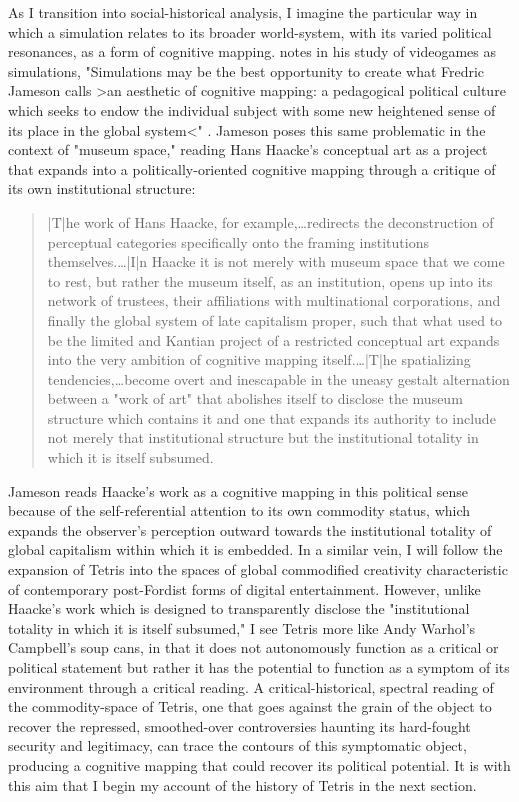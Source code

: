 As I transition into social-historical analysis, I imagine the particular way in which a simulation relates to its broader world-system, with its varied political resonances, as a form of cognitive mapping. \citeauthor{Friedman2005} notes in his study of videogames as simulations, "Simulations may be the best opportunity to create what Fredric Jameson calls >an aesthetic of cognitive mapping: a pedagogical political culture which seeks to endow the individual subject with some new heightened sense of its place in the global system<" \autocite[141]{Friedman2005}. Jameson poses this same problematic in the context of "museum space," reading Hans Haacke's conceptual art as a project that expands into a politically-oriented cognitive mapping through a critique of its own institutional structure:
\blockquote{
  |T|he work of Hans Haacke, for example,…redirects the deconstruction of perceptual categories specifically onto the framing institutions themselves.…|I|n Haacke it is not merely with museum space that we come to rest, but rather the museum itself, as an institution, opens up into its network of trustees, their affiliations with multinational corporations, and finally the global system of late capitalism proper, such that what used to be the limited and Kantian project of a restricted conceptual art expands into the very ambition of cognitive mapping itself.…|T|he spatializing tendencies,…become overt and inescapable in the uneasy gestalt alternation between a "work of art" that abolishes itself to disclose the museum structure which contains it and one that expands its authority to include not merely that institutional structure but the institutional totality in which it is itself subsumed. \autocite*[158]{Jameson1990-zi}
}
Jameson reads Haacke's work as a cognitive mapping in this political sense because of the self-referential attention to its own commodity status, which expands the observer's perception outward towards the institutional totality of global capitalism within which it is embedded. In a similar vein, I will follow the expansion of Tetris into the spaces of global commodified creativity characteristic of contemporary post-Fordist forms of digital entertainment. However, unlike Haacke's work which is designed to transparently disclose the "institutional totality in which it is itself subsumed," I see Tetris more like Andy Warhol's Campbell's soup cans, in that it does not autonomously function as a critical or political statement but rather it has the potential to function as a symptom of its environment through a critical reading. A critical-historical, spectral reading of the commodity-space of Tetris, one that goes against the grain of the object to recover the repressed, smoothed-over controversies haunting its hard-fought security and legitimacy, can trace the contours of this symptomatic object, producing a cognitive mapping that could recover its political potential. It is with this aim that I begin my account of the history of Tetris in the next section.

